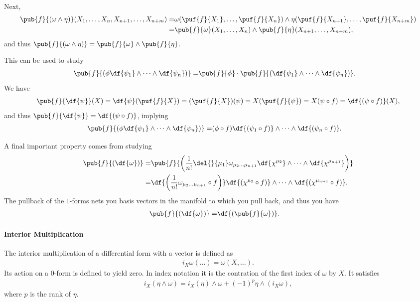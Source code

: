 Next,
\begin{align*}
	\pub{f}{(\omega\wedge\eta)}(X_{1}, \dots, X_{n}, X_{n + 1}, \dots, X_{n + m}) =& \omega(\puf{f}{X_{1}}, \dots, \puf{f}{X_{n}})\wedge\eta(\puf{f}{X_{n + 1}}, \dots, \puf{f}{X_{n + m}}) \\
	=& \pub{f}{\omega}(X_{1}, \dots, X_{n})\wedge\pub{f}{\eta}(X_{n + 1}, \dots, X_{n + m}),
\end{align*}
and thus $\pub{f}{(\omega\wedge\eta)} = \pub{f}{\omega}\wedge\pub{f}{\eta}$.

This can be used to study
\begin{align*}
	\pub{f}{\left(\phi\df{\psi_{1}}\wedge\dots\wedge\df{\psi_{n}}\right)} =& \pub{f}{\phi}\cdot\pub{f}{(\df{\psi_{1}}\wedge\dots\wedge\df{\psi_{n}})}.
\end{align*}
We have
\begin{align*}
	\pub{f}{\df{\psi}}(X) = \df{\psi}(\puf{f}{X}) = (\puf{f}{X})(\psi) = X(\puf{f}{\psi}) = X(\psi\circ f) = \df{(\psi\circ f)}(X),
\end{align*}
and thus $\pub{f}{\df{\psi}} = \df{(\psi\circ f)}$, implying
\begin{align*}
	\pub{f}{\left(\phi\df{\psi_{1}}\wedge\dots\wedge\df{\psi_{n}}\right)} =& (\phi\circ f)\df{(\psi_{1}\circ f)}\wedge\dots\wedge\df{(\psi_{n}\circ f)}.
\end{align*}

A final important property comes from studying
\begin{align*}
	\pub{f}{(\df{\omega})} =& \pub{f}{\left(\frac{1}{n!}\del{}{\mu_{1}}\omega_{\mu_{2}\dots\mu_{n + 1}}\df{\chi^{\mu_{2}}}\wedge\dots\wedge\df{\chi^{\mu_{n + 1}}}\right)} \\
	=& \df{\left(\frac{1}{n!}\omega_{\mu_{2}\dots\mu_{n + 1}}\circ f\right)}\df{(\chi^{\mu_{2}}\circ f)}\wedge\dots\wedge\df{(\chi^{\mu_{n  +1}}\circ f)}.
\end{align*}
The pullback of the $1$-forms nets you basis vectors in the manifold to which you pull back, and thus you have
\begin{align*}
	\pub{f}{(\df{\omega})} =& \df{(\pub{f}{\omega})}.
\end{align*}

\paragraph{Interior Multiplication}
The interior multiplication of a differential form with a vector is defined as
\begin{align*}
	i_{X}\omega(\dots) = \omega(X, \dots).
\end{align*}
Its action on a 0-form is defined to yield zero. In index notation it is the contration of the first index of $\omega$ by $X$. It satisfies
\begin{align*}
	i_{X}(\eta\wedge\omega) = i_{X}(\eta)\wedge\omega + (-1)^{p}\eta\wedge(i_{X}\omega),
\end{align*}
where $p$ is the rank of $\eta$.

